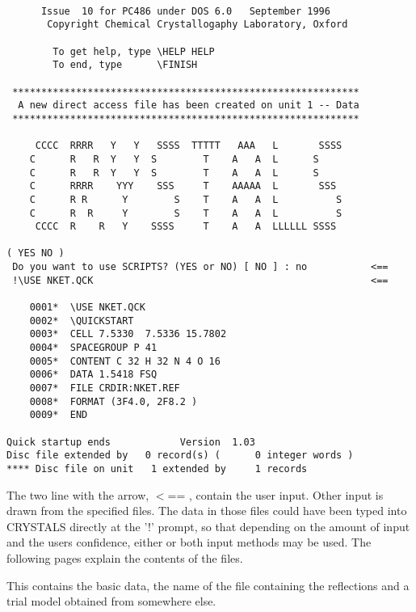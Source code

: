 \documentclass[10pt,a4paper]{report}
\begin{document}
\small\begin{verbatim}

      Issue  10 for PC486 under DOS 6.0   September 1996
       Copyright Chemical Crystallogaphy Laboratory, Oxford

        To get help, type \HELP HELP
        To end, type      \FINISH

 ************************************************************
  A new direct access file has been created on unit 1 -- Data
 ************************************************************

     CCCC  RRRR   Y   Y   SSSS  TTTTT   AAA   L       SSSS
    C      R   R  Y   Y  S        T    A   A  L      S
    C      R   R  Y   Y  S        T    A   A  L      S
    C      RRRR    YYY    SSS     T    AAAAA  L       SSS
    C      R R      Y        S    T    A   A  L          S
    C      R  R     Y        S    T    A   A  L          S
     CCCC  R    R   Y    SSSS     T    A   A  LLLLLL SSSS

( YES NO )
 Do you want to use SCRIPTS? (YES or NO) [ NO ] : no           <==
 !\USE NKET.QCK                                                <==

    0001*  \USE NKET.QCK
    0002*  \QUICKSTART
    0003*  CELL 7.5330  7.5336 15.7802
    0004*  SPACEGROUP P 41
    0005*  CONTENT C 32 H 32 N 4 O 16
    0006*  DATA 1.5418 FSQ
    0007*  FILE CRDIR:NKET.REF
    0008*  FORMAT (3F4.0, 2F8.2 )
    0009*  END

Quick startup ends            Version  1.03
Disc file extended by   0 record(s) (      0 integer words )
**** Disc file on unit   1 extended by     1 records

\end{verbatim}\normalsize




The two line with the arrow, $<$== , contain the user input. Other input
 is drawn from the specified files. The data in those files could have
 been typed into CRYSTALS directly at the '!' prompt, so that depending
 on the amount of input and the users confidence, either or
 both input methods may be used. The following pages explain the contents of the files.





\bigskip{}


 This contains the basic data, the name of the file containing the reflections
 and a trial model obtained from somewhere else.
\end{document}
